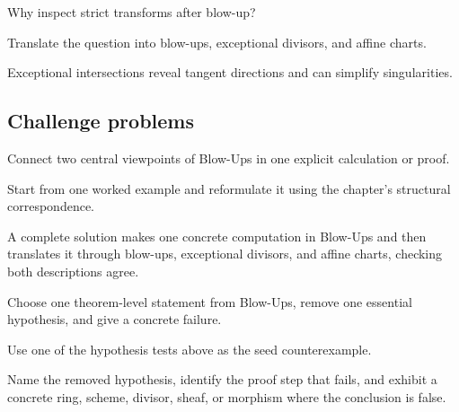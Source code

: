 \begin{exercise}\label{exr:vi45-expand-14}
Why inspect strict transforms after blow-up?
\end{exercise}
\begin{hint}
Translate the question into blow-ups, exceptional divisors, and affine charts.
\end{hint}
\begin{solution}
Exceptional intersections reveal tangent directions and can simplify singularities.
\end{solution}

\subsection*{Challenge problems}

\begin{exercise}\label{exr:vi45-expand-15}
Connect two central viewpoints of Blow-Ups in one explicit calculation or proof.
\end{exercise}
\begin{hint}
Start from one worked example and reformulate it using the chapter's structural correspondence.
\end{hint}
\begin{solution}
A complete solution makes one concrete computation in Blow-Ups and then translates it through blow-ups, exceptional divisors, and affine charts, checking both descriptions agree.
\end{solution}

\begin{exercise}\label{exr:vi45-expand-16}
Choose one theorem-level statement from Blow-Ups, remove one essential hypothesis, and give a concrete failure.
\end{exercise}
\begin{hint}
Use one of the hypothesis tests above as the seed counterexample.
\end{hint}
\begin{solution}
Name the removed hypothesis, identify the proof step that fails, and exhibit a concrete ring, scheme, divisor, sheaf, or morphism where the conclusion is false.
\end{solution}

